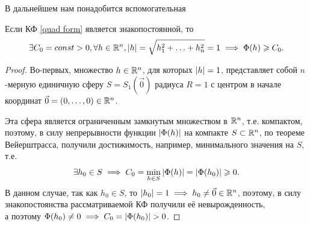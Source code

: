 \documentclass[../../main.tex]{subfiles}
\begin{document}
	В дальнейшем нам понадобится вспомогательная
	\begin{lem}
		Если КФ \eqref{quad form} является знакопостоянной, то
		\begin{equation}
		\label{eval form}
			\exists C_0 = const > 0,
			\forall h \in \mathbb{R}^n, \left|{h}\right| = \sqrt{h_1^2 + \ldots + h_n^2} = 1
			\implies \Phi(h) \geqslant C_0.
		\end{equation}
	\end{lem}
	\begin{proof}
		Во-первых, множество $h \in \mathbb{R}^n$, для которых $\left|{h}\right| = 1$,
		представляет собой $n$-мерную единичную сферу $S = S_1(\vec{0})$
		радиуса $R = 1$ с центром в начале координат
		$\vec{0} = (0, \ldots, 0) \in \mathbb{R}^n$.
		
		Эта сфера является ограниченным замкнутым множеством в $\mathbb{R}^n$, т.е.
		компактом, поэтому, в силу непрерывности функции $\left|{\Phi(h)}\right|$
		на компакте $S \subset \mathbb{R}^n$, по теореме Вейерштрасса, получили
		достижимость, например, минимального значения на $S$, т.е.
		\[
			\exists h_0 \in S \implies
			C_0 = \min_{h \in S} \left|{\Phi(h)}\right|
			= \left|{\Phi(h_0)}\right| \geqslant 0.
		\]
		В данном случае, так как $h_0 \in S$, то
		$\left|{h_0}\right| = 1 \implies h_0 \ne \vec{0} \in \mathbb{R}^n$,
		поэтому, в силу знакопостоянства рассматриваемой КФ
		получили её невырожденность, \\
		а поэтому $\Phi(h_0) \ne 0 \implies C_0 = \left|{\Phi(h_0)}\right| > 0$.
	\end{proof}
\end{document}
